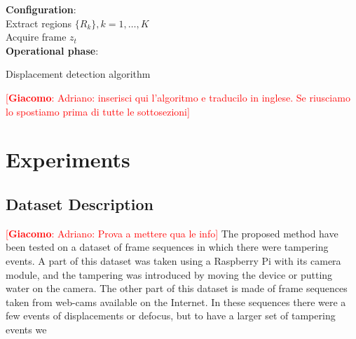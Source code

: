 \documentclass{llncs}
\newcommand{\gi}[1]{{\textcolor{red}{[\small \textbf{Giacomo}: #1]}}}
\begin{document}
\begin{algorithm}[tp]
	\LinesNumbered
	\textbf{Configuration}:\\
	 Extract regions $\{R_k\}, k=1,\dots,K$  \\
	 
	{	 Acquire frame $z_t$ \\
		 
	}
	 
	\textbf{Operational phase}:\\
	    
	\caption{Displacement detection algorithm}
	\label{alg:DISPL}
\end{algorithm}
\gi{Adriano: inserisci qui l'algoritmo e traducilo in inglese. Se riusciamo lo spostiamo prima di tutte le sottosezioni}

\section{Experiments}\label{sec:experiments}

\subsection{Dataset Description}\label{subsec:Dataset}
\gi{Adriano: Prova a mettere qua le info}
The proposed method have been tested on a dataset of frame sequences in which there were tampering events.
A part of this dataset was taken using a Raspberry Pi with its camera module, and the tampering was introduced by moving the device or putting water on the camera.
The other part of this dataset is made of frame sequences taken from web-cams available on the Internet. 
In these sequences there were a few events of displacements or defocus, but to have a larger set of tampering events we
\end{document}
